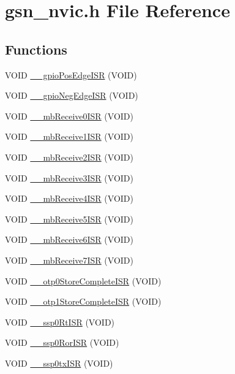\hypertarget{a00531}{
\section{gsn\_\-nvic.h File Reference}
\label{a00531}
}
\subsection*{Functions}
\begin{DoxyCompactItemize}
\item 
VOID \hyperlink{a00531_a54068d383e67f83174d7d2bf70408caa}{\_\-\_\-gpioPosEdgeISR} (VOID)
\item 
VOID \hyperlink{a00531_a2604cffadfeb2f30a4cb2e167739a325}{\_\-\_\-gpioNegEdgeISR} (VOID)
\item 
VOID \hyperlink{a00531_a5681bfd427d37660fcc1a5a7138dca25}{\_\-\_\-mbReceive0ISR} (VOID)
\item 
VOID \hyperlink{a00531_a272dcd7368a4bc18e60ea51d52694aba}{\_\-\_\-mbReceive1ISR} (VOID)
\item 
VOID \hyperlink{a00531_a057c70eb870e2ee59cbe3048b2ebc992}{\_\-\_\-mbReceive2ISR} (VOID)
\item 
VOID \hyperlink{a00531_a284c2fd6a646e7090c230d8431251608}{\_\-\_\-mbReceive3ISR} (VOID)
\item 
VOID \hyperlink{a00531_a09edfb1859ae0500d45d361ac510ee9b}{\_\-\_\-mbReceive4ISR} (VOID)
\item 
VOID \hyperlink{a00531_a59967432eb38e70896d453fb684fc5ab}{\_\-\_\-mbReceive5ISR} (VOID)
\item 
VOID \hyperlink{a00531_ad3b17a7ac8cbcd64c3bb41b29b669600}{\_\-\_\-mbReceive6ISR} (VOID)
\item 
VOID \hyperlink{a00531_a3cf78bce8de0891c2dfc52dfb2466b3d}{\_\-\_\-mbReceive7ISR} (VOID)
\item 
VOID \hyperlink{a00531_a38aba6cf33912a05776e05f57b9683ff}{\_\-\_\-otp0StoreCompleteISR} (VOID)
\item 
VOID \hyperlink{a00531_a792eeaef1eaee3fe139b3ad6328ebf49}{\_\-\_\-otp1StoreCompleteISR} (VOID)
\item 
VOID \hyperlink{a00531_a9121477fad03672a17f3d65d4a8b36e6}{\_\-\_\-ssp0RtISR} (VOID)
\item 
VOID \hyperlink{a00531_a43d5ca19175af2dbc2974edd1764aa51}{\_\-\_\-ssp0RorISR} (VOID)
\item 
VOID \hyperlink{a00531_a26ffc39ca9d85a08a211f0b2fae16a1b}{\_\-\_\-ssp0txISR} (VOID)
\item 

\end{DoxyCompactItemize}
